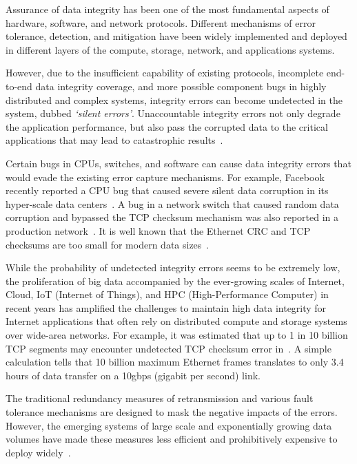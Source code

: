 Assurance of data integrity has been one of the most fundamental aspects of hardware, software, and network protocols.
Different mechanisms of error tolerance, detection, and mitigation have been widely implemented and deployed in different layers of 
the compute, storage, network, and applications systems.

However, due to the insufficient capability of existing protocols, incomplete end-to-end data integrity coverage, 
and more possible component bugs in highly distributed and complex systems, integrity errors can become undetected in 
the system, dubbed {\it `silent errors'}.  Unaccountable integrity errors not only degrade the application performance, but also pass the corrupted data
to the critical applications that may lead to catastrophic results~\cite{Jung2019HighPerformanceEI}.

Certain bugs in CPUs, switches, and software can cause data integrity errors that would evade the existing error capture mechanisms.
For example, Facebook recently reported a CPU bug that caused severe silent data corruption in its hyper-scale data 
centers~\cite{facebook:cpu:2021}. A bug in a network switch that caused random data corruption and bypassed the TCP checksum 
mechanism was also reported in a production network~\cite{swip:pearc:2019}. It is well known that the Ethernet CRC and TCP checksums are 
too small for modern data sizes~\cite{tcp:ccr2000}.

While the probability of undetected integrity errors seems to be extremely low, the proliferation of big data accompanied by the ever-growing scales of Internet, 
Cloud, IoT (Internet of Things), and HPC (High-Performance Computer) in recent years has amplified the challenges to maintain high data integrity for 
Internet applications that often rely on distributed compute and storage systems over wide-area networks. For example, it was estimated that up to 1 in 10 billion 
TCP segments may encounter undetected TCP checksum error in~\cite{tcp:ccr2000}. A simple calculation tells that 10 billion maximum Ethernet frames translates to 
only 3.4 hours of data transfer on a 10gbps (gigabit per second) link. 

The traditional redundancy measures of retransmission and various fault tolerance mechanisms are designed to mask the negative impacts of the errors.
However, the emerging systems of large scale and exponentially growing data volumes have made these measures less efficient and prohibitively expensive to deploy 
widely~\cite{GrayFailure:2017}.

